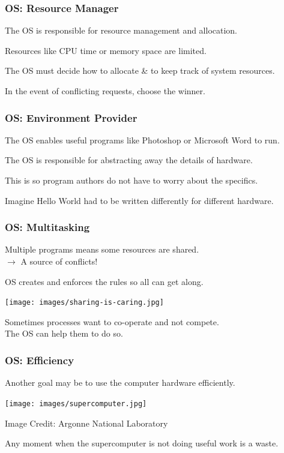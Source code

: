 \begin{frame}
\frametitle{OS: Resource Manager}

The OS is responsible for resource management and allocation.

Resources like CPU time or memory space are limited.

The OS must decide how to allocate \& to keep track of system resources.

In the event of conflicting requests, choose the winner.


\end{frame}

\begin{frame}
\frametitle{OS: Environment Provider}

The OS enables useful programs like Photoshop or Microsoft Word to run. 

The OS is responsible for abstracting away the details of hardware.

This is so program authors do not have to worry about the specifics.

Imagine Hello World had to be written differently for different hardware.


\end{frame}

\begin{frame}
\frametitle{OS: Multitasking}
Multiple programs means some resources are shared.\\
\quad $\rightarrow$ A source of conflicts!

OS creates and enforces the rules so all can get along.

\begin{center}
	\texttt{[image: images/sharing-is-caring.jpg]}
\end{center}

Sometimes processes want to co-operate and not compete.\\
\quad The OS can help them to do so.


\end{frame}

\begin{frame}
\frametitle{OS: Efficiency}
Another goal may be to use the computer hardware efficiently.

\begin{center}
	\texttt{[image: images/supercomputer.jpg]}
\end{center}
\hfill Image Credit: Argonne National Laboratory

Any moment when the supercomputer is not doing useful work is a waste.

\end{frame}

